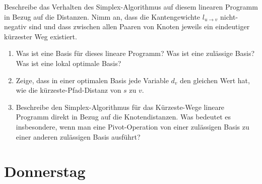 \documentclass{uebung_cs}
\begin{document}
\begin{exercise}
	Beschreibe das Verhalten des Simplex-Algorithmus auf diesem linearen Programm in Bezug auf die Distanzen. Nimm an, dass die Kantengewichte $l_{u \rightarrow v}$ nicht-negativ sind und dass zwischen allen Paaren von Knoten jeweils ein eindeutiger kürzester Weg existiert.
	\begin{enumerate}
		\item\medium Was ist eine Basis für dieses lineare Programm? Was ist eine zulässige Basis? Was ist eine lokal optimale Basis?
		\item\hard Zeige, dass in einer optimalen Basis jede Variable $d_v$ den gleichen Wert hat, wie die kürzeste-Pfad-Distanz von $s$ zu $v$.
		\item\medium Beschreibe den Simplex-Algorithmus für das Kürzeste-Wege lineare Programm direkt in Bezug auf die Knotendistanzen. Was bedeutet es insbesondere, wenn man eine Pivot-Operation von einer zulässigen Basis zu einer anderen zulässigen Basis ausführt?
	\end{enumerate}
	
\end{exercise}

\section*{Donnerstag}
\end{document}
